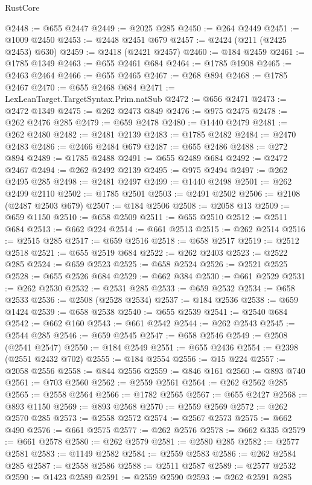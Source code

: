 \begin{lexlean}{RustCore}
\begin{coremodule}
@2448 := @655 @2447
@2449 := @2025 @285
@2450 := @264 @2449
@2451 := @1009 @2450
@2453 := @2448 @2451 @679
@2457 := @2424 (@211 (@2425 @2453) @630)
@2459 := @2418 (@2421 @2457)
@2460 := @184 @2459
@2461 := @1785 @1349
@2463 := @655 @2461 @684
@2464 := @1785 @1908
@2465 := @2463 @2464
@2466 := @655 @2465
@2467 := @268 @894
@2468 := @1785 @2467
@2470 := @655 @2468 @684
@2471 := LexLeanTarget.TargetSyntax.Prim.natSub
@2472 := @656 @2471
@2473 := @2472 @1349
@2475 := @262 @2473 @849
@2476 := @975 @2475
@2478 := @262 @2476 @285
@2479 := @659 @2478
@2480 := @1440 @2479
@2481 := @262 @2480
@2482 := @2481 @2139
@2483 := @1785 @2482
@2484 := @2470 @2483
@2486 := @2466 @2484 @679
@2487 := @655 @2486
@2488 := @272 @894
@2489 := @1785 @2488
@2491 := @655 @2489 @684
@2492 := @2472 @2467
@2494 := @262 @2492 @2139
@2495 := @975 @2494
@2497 := @262 @2495 @285
@2498 := @2481 @2497
@2499 := @1440 @2498
@2501 := @262 @2499 @2110
@2502 := @1785 @2501
@2503 := @2491 @2502
@2506 := @2108 (@2487 @2503 @679)
@2507 := @184 @2506
@2508 := @2058 @13
@2509 := @659 @1150
@2510 := @658 @2509
@2511 := @655 @2510
@2512 := @2511 @684
@2513 := @662 @224
@2514 := @661 @2513
@2515 := @262 @2514
@2516 := @2515 @285
@2517 := @659 @2516
@2518 := @658 @2517
@2519 := @2512 @2518
@2521 := @655 @2519 @684
@2522 := @262 @2403
@2523 := @2522 @285
@2524 := @659 @2523
@2525 := @658 @2524
@2526 := @2521 @2525
@2528 := @655 @2526 @684
@2529 := @662 @384
@2530 := @661 @2529
@2531 := @262 @2530
@2532 := @2531 @285
@2533 := @659 @2532
@2534 := @658 @2533
@2536 := @2508 (@2528 @2534)
@2537 := @184 @2536
@2538 := @659 @1424
@2539 := @658 @2538
@2540 := @655 @2539
@2541 := @2540 @684
@2542 := @662 @160
@2543 := @661 @2542
@2544 := @262 @2543
@2545 := @2544 @285
@2546 := @659 @2545
@2547 := @658 @2546
@2549 := @2508 (@2541 @2547)
@2550 := @184 @2549
@2551 := @655 @2436
@2554 := @2398 (@2551 @2432 @702)
@2555 := @184 @2554
@2556 := @15 @224
@2557 := @2058 @2556
@2558 := @844 @2556
@2559 := @846 @161
@2560 := @893 @740
@2561 := @703 @2560
@2562 := @2559 @2561
@2564 := @262 @2562 @285
@2565 := @2558 @2564
@2566 := @1782 @2565
@2567 := @655 @2427
@2568 := @893 @1150
@2569 := @893 @2568
@2570 := @2559 @2569
@2572 := @262 @2570 @285
@2573 := @2558 @2572
@2574 := @2567 @2573
@2575 := @662 @490
@2576 := @661 @2575
@2577 := @262 @2576
@2578 := @662 @335
@2579 := @661 @2578
@2580 := @262 @2579
@2581 := @2580 @285
@2582 := @2577 @2581
@2583 := @1149 @2582
@2584 := @2559 @2583
@2586 := @262 @2584 @285
@2587 := @2558 @2586
@2588 := @2511 @2587
@2589 := @2577 @2532
@2590 := @1423 @2589
@2591 := @2559 @2590
@2593 := @262 @2591 @285

\end{coremodule}
\end{lexlean}
